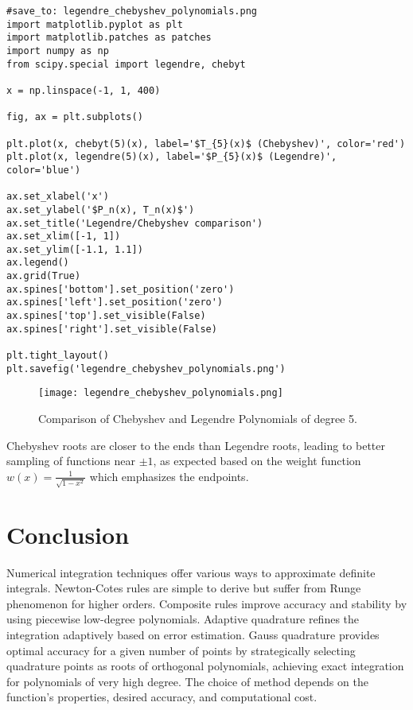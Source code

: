 \documentclass{article}
\begin{document}
\begin{verbatim}
#save_to: legendre_chebyshev_polynomials.png
import matplotlib.pyplot as plt
import matplotlib.patches as patches
import numpy as np
from scipy.special import legendre, chebyt

x = np.linspace(-1, 1, 400)

fig, ax = plt.subplots()

plt.plot(x, chebyt(5)(x), label='$T_{5}(x)$ (Chebyshev)', color='red')
plt.plot(x, legendre(5)(x), label='$P_{5}(x)$ (Legendre)', color='blue')

ax.set_xlabel('x')
ax.set_ylabel('$P_n(x), T_n(x)$')
ax.set_title('Legendre/Chebyshev comparison')
ax.set_xlim([-1, 1])
ax.set_ylim([-1.1, 1.1])
ax.legend()
ax.grid(True)
ax.spines['bottom'].set_position('zero')
ax.spines['left'].set_position('zero')
ax.spines['top'].set_visible(False)
ax.spines['right'].set_visible(False)

plt.tight_layout()
plt.savefig('legendre_chebyshev_polynomials.png')
\end{verbatim}

\begin{figure}[h]
    \centering
    \texttt{[image: legendre\_chebyshev\_polynomials.png]}
    \caption{Comparison of Chebyshev and Legendre Polynomials of degree 5.}
    \label{fig:legendre_chebyshev_polynomials}
\end{figure}

Chebyshev roots are closer to the ends than Legendre roots, leading to better sampling of functions near $\pm 1$, as expected based on the weight function $w(x) = \frac{1}{\sqrt{1-x^2}}$ which emphasizes the endpoints.

\section{Conclusion}
Numerical integration techniques offer various ways to approximate definite integrals. Newton-Cotes rules are simple to derive but suffer from Runge phenomenon for higher orders. Composite rules improve accuracy and stability by using piecewise low-degree polynomials. Adaptive quadrature refines the integration adaptively based on error estimation. Gauss quadrature provides optimal accuracy for a given number of points by strategically selecting quadrature points as roots of orthogonal polynomials, achieving exact integration for polynomials of very high degree. The choice of method depends on the function's properties, desired accuracy, and computational cost.
\end{document}
